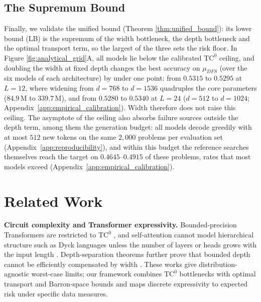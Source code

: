 \documentclass{article}
\begin{document}
\subsection{The Supremum Bound}

Finally, we validate the unified bound (Theorem \ref{thm:unified_bound}): its lower bound (LB) is the supremum of the width bottleneck, the depth bottleneck and the optimal transport term, so the largest of the three sets the risk floor. In Figure \ref{fig:analytical_grid}A, all models lie below the calibrated $\text{TC}^0$ ceiling, and doubling the width at fixed depth changes the best accuracy on $\mu_{DFS}$ (over the six models of each architecture) by under one point: from $0.5315$ to $0.5295$ at $L=12$, where widening from $d=768$ to $d=1536$ quadruples the core parameters ($84.9\,\mathrm{M}$ to $339.7\,\mathrm{M}$), and from $0.5280$ to $0.5340$ at $L=24$ ($d=512$ to $d=1024$; Appendix~\ref{app:empirical_calibration}). Width therefore does not raise this ceiling. The asymptote of the ceiling also absorbs failure sources outside the depth term, among them the generation budget: all models decode greedily with at most $512$ new tokens on the same $2{,}000$ problems per evaluation set (Appendix~\ref{app:reproducibility}), and within this budget the reference searches themselves reach the target on $0.4645$--$0.4915$ of these problems, rates that most models exceed (Appendix~\ref{app:empirical_calibration}). 

\newpage
\section{Related Work}
\label{sec:related_work}

\textbf{Circuit complexity and Transformer expressivity.} 
Bounded-precision Transformers are restricted to $\text{TC}^0$ \citep{merrill2023parallelismtradeofflimitationslogprecision}, and self-attention cannot model hierarchical structure such as Dyck languages unless the number of layers or heads grows with the input length \citep{Hahn_2020}. %
 Depth-separation theorems further prove that bounded depth cannot be efficiently compensated by width \citep{eldan2016powerdepthfeedforwardneural, levine2021depthtowidthinterplayselfattention}. These works give distribution-agnostic worst-case limits; our framework combines $\text{TC}^0$ bottlenecks with optimal transport and Barron-space bounds \citep{Barron1993, MAKOVOZ199698} and maps discrete expressivity to expected risk under specific data measures.
\end{document}
